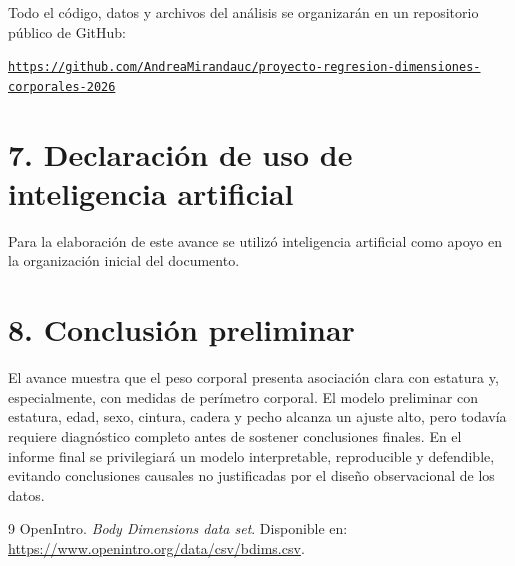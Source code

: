 \documentclass[10pt,letterpaper]{article}
\begin{document}
Todo el código, datos y archivos del análisis se organizarán en un repositorio público de GitHub:

\begin{center}
\href{https://github.com/AndreaMirandauc/proyecto-regresion-dimensiones-corporales-2026}{\texttt{https://github.com/AndreaMirandauc/proyecto-regresion-dimensiones-corporales-2026}}
\end{center}



\section*{7. Declaración de uso de inteligencia artificial}

Para la elaboración de este avance se utilizó inteligencia artificial como apoyo en la organización inicial del documento.
\section*{8. Conclusión preliminar}

El avance muestra que el peso corporal presenta asociación clara con estatura y, especialmente, con medidas de perímetro corporal. El modelo preliminar con estatura, edad, sexo, cintura, cadera y pecho alcanza un ajuste alto, pero todavía requiere diagnóstico completo antes de sostener conclusiones finales. En el informe final se privilegiará un modelo interpretable, reproducible y defendible, evitando conclusiones causales no justificadas por el diseño observacional de los datos.

\begin{thebibliography}{9}
 OpenIntro. \textit{Body Dimensions data set}. Disponible en: \url{https://www.openintro.org/data/csv/bdims.csv}.

\end{thebibliography}
\end{document}
